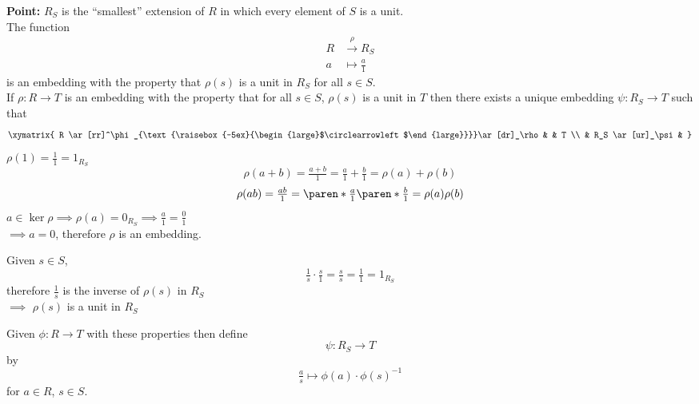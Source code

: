 \textbf{Point:} $R_S$ is the ``smallest'' extension of $R$ in which every element of $S$ is a unit. \\
\prop The function
\begin{align*}
R &\overset{\rho}{\to} R_S \\
a &\mapsto \tfrac{a}{1}
\end{align*}
is an embedding with the property that $\rho(s)$ is a unit in $R_S$ for all $s\in S$. \\
If $\rho\colon R \to T$ is an embedding with the property that for all $s\in S$, $\rho(s)$ is a unit in $T$ then there exists a unique embedding $\psi\colon R_S\to T$ such that
\[ \xymatrix{
R \ar[rr]^\phi_{\text{\raisebox{-5ex}{\begin{large}$\circlearrowleft$\end{large}}}}\ar[dr]_\rho & & T \\
 & R_S \ar[ur]_\psi &
} \]
\pf $\rho(1)=\tfrac11=1_{R_S}$
\[ \rho(a+b) = \tfrac{a+b}{1} = \tfrac{a}{1} + \tfrac{b}{1} = \rho(a) + \rho(b) \]
\[ \rho(ab) = \tfrac{ab}{1} = \paren*{\tfrac{a}{1}}\paren*{\tfrac{b}{1}} = \rho(a)\rho(b) \]
$a\in\ker\rho \implies \rho(a) = 0_{R_S} \implies \tfrac{a}{1}=\tfrac{0}{1}$ \\
$\implies a=0$, therefore $\rho$ is an embedding.

Given $s\in S$,
\[ \tfrac1s \cdot \tfrac s1 = \tfrac ss = \tfrac11 = 1_{R_S} \]
therefore $\tfrac1s$ is the inverse of $\rho(s)$ in $R_S$ \\
$\implies$ $\rho(s)$ is a unit in $R_S$

Given $\phi\colon R\to T$ with these properties then define
\[ \psi\colon R_S \to T \]
by
\[ \tfrac as \mapsto \phi(a)\cdot\phi(s)^{-1} \]
for $a\in R$, $s\in S$. \\
